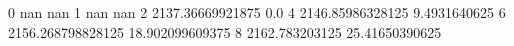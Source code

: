 0 nan nan
1 nan nan
2 2137.36669921875 0.0
4 2146.85986328125 9.4931640625
6 2156.268798828125 18.902099609375
8 2162.783203125 25.41650390625
